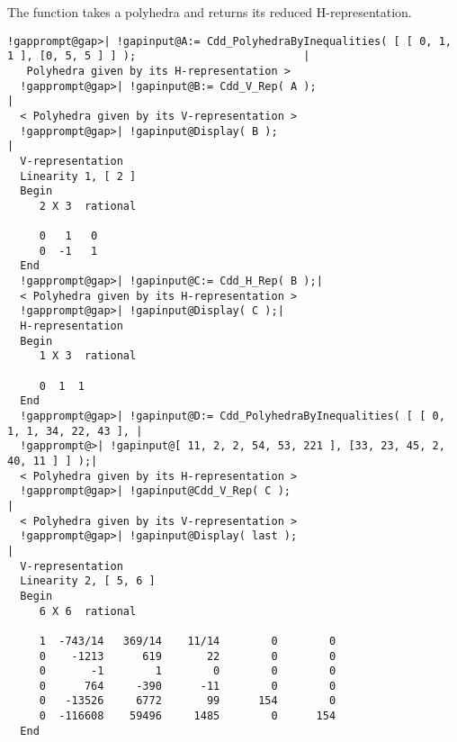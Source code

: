 \documentclass[a4paper,11pt]{report}
\begin{document}
{{{ The function takes a polyhedra and returns its reduced H-representation. }

 
\begin{Verbatim}[commandchars=!@|,fontsize=\small,frame=single,label=Example]
  !gapprompt@gap>| !gapinput@A:= Cdd_PolyhedraByInequalities( [ [ 0, 1, 1 ], [0, 5, 5 ] ] );                          |
   Polyhedra given by its H-representation >
  !gapprompt@gap>| !gapinput@B:= Cdd_V_Rep( A );                                    |
  < Polyhedra given by its V-representation >
  !gapprompt@gap>| !gapinput@Display( B );                                   |
  V-representation 
  Linearity 1, [ 2 ]
  Begin 
     2 X 3  rational
                
     0   1   0 
     0  -1   1 
  End
  !gapprompt@gap>| !gapinput@C:= Cdd_H_Rep( B );|
  < Polyhedra given by its H-representation >
  !gapprompt@gap>| !gapinput@Display( C );|
  H-representation 
  Begin 
     1 X 3  rational
              
     0  1  1 
  End
  !gapprompt@gap>| !gapinput@D:= Cdd_PolyhedraByInequalities( [ [ 0, 1, 1, 34, 22, 43 ], |
  !gapprompt@>| !gapinput@[ 11, 2, 2, 54, 53, 221 ], [33, 23, 45, 2, 40, 11 ] ] );|
  < Polyhedra given by its H-representation >
  !gapprompt@gap>| !gapinput@Cdd_V_Rep( C );                                                                                                     |
  < Polyhedra given by its V-representation >
  !gapprompt@gap>| !gapinput@Display( last );                                                                                                    |
  V-representation 
  Linearity 2, [ 5, 6 ]
  Begin 
     6 X 6  rational
                                                          
     1  -743/14   369/14    11/14        0        0 
     0    -1213      619       22        0        0 
     0       -1        1        0        0        0 
     0      764     -390      -11        0        0 
     0   -13526     6772       99      154        0 
     0  -116608    59496     1485        0      154 
  End
\end{Verbatim}
 }

 }

   
\end{document}
